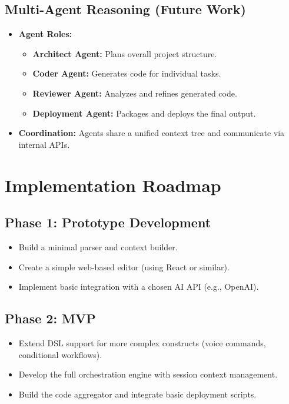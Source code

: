 \documentclass[11pt]{article}
\begin{document}
\subsection{Multi-Agent Reasoning (Future Work)}
\begin{itemize}
    \item \textbf{Agent Roles:}
    \begin{itemize}
        \item \textbf{Architect Agent:} Plans overall project structure.
        \item \textbf{Coder Agent:} Generates code for individual tasks.
        \item \textbf{Reviewer Agent:} Analyzes and refines generated code.
        \item \textbf{Deployment Agent:} Packages and deploys the final output.
    \end{itemize}
    \item \textbf{Coordination:} Agents share a unified context tree and communicate via internal APIs.
\end{itemize}

\section{Implementation Roadmap}

\subsection{Phase 1: Prototype Development}
\begin{itemize}
    \item Build a minimal parser and context builder.
    \item Create a simple web-based editor (using React or similar).
    \item Implement basic integration with a chosen AI API (e.g., OpenAI).
\end{itemize}

\subsection{Phase 2: MVP}
\begin{itemize}
    \item Extend DSL support for more complex constructs (voice commands, conditional workflows).
    \item Develop the full orchestration engine with session context management.
    \item Build the code aggregator and integrate basic deployment scripts.
\end{itemize}
\end{document}
